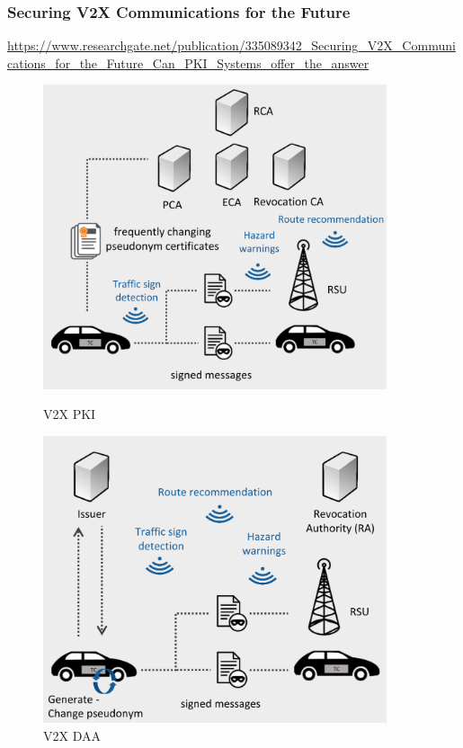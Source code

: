 \documentclass{ctexbeamer}
\begin{document}
\begin{frame}
\frametitle{Securing V2X Communications for the Future}

    \url{https://www.researchgate.net/publication/335089342_Securing_V2X_Communications_for_the_Future_Can_PKI_Systems_offer_the_answer}

    \begin{figure}[htbp]
        \centering
        \begin{minipage}[t]{0.48\textwidth}
            \centering
            \includegraphics[width=0.9\textwidth]{pic/v2x.pki2.png}
           \caption{V2X PKI}
        \end{minipage}
        \begin{minipage}[t]{0.48\textwidth}
            \centering
            \includegraphics[width=0.9\textwidth]{pic/v2x.daa2.png}
            \caption{V2X DAA}
        \end{minipage}
    \end{figure}

\end{frame}
\end{document}
